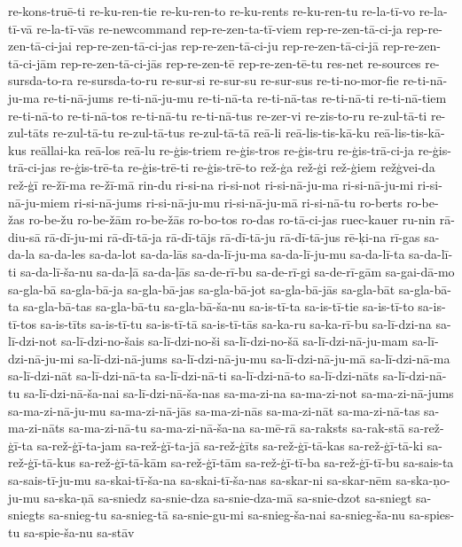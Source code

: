 {re-kons-truē-ti
re-ku-ren-tie
re-ku-ren-to
re-ku-rents
re-ku-ren-tu
re-la-tī-vo
re-la-tī-vā
re-la-tī-vās
re-newcommand
rep-re-zen-ta-tī-viem
rep-re-zen-tā-ci-ja
rep-re-zen-tā-ci-jai
rep-re-zen-tā-ci-jas
rep-re-zen-tā-ci-ju
rep-re-zen-tā-ci-jā
rep-re-zen-tā-ci-jām
rep-re-zen-tā-ci-jās
rep-re-zen-tē
rep-re-zen-tē-tu
res-net
re-sources
re-sursda-to-ra
re-sursda-to-ru
re-sur-si
re-sur-su
re-sur-sus
re-ti-no-mor-fie
re-ti-nā-ju-ma
re-ti-nā-jums
re-ti-nā-ju-mu
re-ti-nā-ta
re-ti-nā-tas
re-ti-nā-ti
re-ti-nā-tiem
re-ti-nā-to
re-ti-nā-tos
re-ti-nā-tu
re-ti-nā-tus
re-zer-vi
re-zis-to-ru
re-zul-tā-ti
re-zul-tāts
re-zul-tā-tu
re-zul-tā-tus
re-zul-tā-tā
reā-li
reā-lis-tis-kā-ku
reā-lis-tis-kā-kus
reāllai-ka
reā-los
reā-lu
re-ģis-triem
re-ģis-tros
re-ģis-tru
re-ģis-trā-ci-ja
re-ģis-trā-ci-jas
re-ģis-trē-ta
re-ģis-trē-ti
re-ģis-trē-to
rež-ģa
rež-ģi
rež-ģiem
režģvei-da
rež-ģī
re-žī-ma
re-žī-mā
rin-du
ri-si-na
ri-si-not
ri-si-nā-ju-ma
ri-si-nā-ju-mi
ri-si-nā-ju-miem
ri-si-nā-jums
ri-si-nā-ju-mu
ri-si-nā-ju-mā
ri-si-nā-tu
ro-berts
ro-be-žas
ro-be-žu
ro-be-žām
ro-be-žās
ro-bo-tos
ro-das
ro-tā-ci-jas
ruec-kauer
ru-nin
rā-diu-sā
rā-dī-ju-mi
rā-dī-tā-ja
rā-dī-tājs
rā-dī-tā-ju
rā-dī-tā-jus
rē-ķi-na
rī-gas
sa-da-la
sa-da-les
sa-da-lot
sa-da-lās
sa-da-lī-ju-ma
sa-da-lī-ju-mu
sa-da-lī-ta
sa-da-lī-ti
sa-da-lī-ša-nu
sa-da-ļā
sa-da-ļās
sa-de-rī-bu
sa-de-rī-gi
sa-de-rī-gām
sa-gai-dā-mo
sa-gla-bā
sa-gla-bā-ja
sa-gla-bā-jas
sa-gla-bā-jot
sa-gla-bā-jās
sa-gla-bāt
sa-gla-bā-ta
sa-gla-bā-tas
sa-gla-bā-tu
sa-gla-bā-ša-nu
sa-is-tī-ta
sa-is-tī-tie
sa-is-tī-to
sa-is-tī-tos
sa-is-tīts
sa-is-tī-tu
sa-is-tī-tā
sa-is-tī-tās
sa-ka-ru
sa-ka-rī-bu
sa-lī-dzi-na
sa-lī-dzi-not
sa-lī-dzi-no-šais
sa-lī-dzi-no-ši
sa-lī-dzi-no-šā
sa-lī-dzi-nā-ju-mam
sa-lī-dzi-nā-ju-mi
sa-lī-dzi-nā-jums
sa-lī-dzi-nā-ju-mu
sa-lī-dzi-nā-ju-mā
sa-lī-dzi-nā-ma
sa-lī-dzi-nāt
sa-lī-dzi-nā-ta
sa-lī-dzi-nā-ti
sa-lī-dzi-nā-to
sa-lī-dzi-nāts
sa-lī-dzi-nā-tu
sa-lī-dzi-nā-ša-nai
sa-lī-dzi-nā-ša-nas
sa-ma-zi-na
sa-ma-zi-not
sa-ma-zi-nā-jums
sa-ma-zi-nā-ju-mu
sa-ma-zi-nā-jās
sa-ma-zi-nās
sa-ma-zi-nāt
sa-ma-zi-nā-tas
sa-ma-zi-nāts
sa-ma-zi-nā-tu
sa-ma-zi-nā-ša-na
sa-mē-rā
sa-raksts
sa-rak-stā
sa-rež-ģī-ta
sa-rež-ģī-ta-jam
sa-rež-ģī-ta-jā
sa-rež-ģīts
sa-rež-ģī-tā-kas
sa-rež-ģī-tā-ki
sa-rež-ģī-tā-kus
sa-rež-ģī-tā-kām
sa-rež-ģī-tām
sa-rež-ģī-tī-ba
sa-rež-ģī-tī-bu
sa-sais-ta
sa-sais-tī-ju-mu
sa-skai-tī-ša-na
sa-skai-tī-ša-nas
sa-skar-ni
sa-skar-nēm
sa-ska-ņo-ju-mu
sa-ska-ņā
sa-sniedz
sa-snie-dza
sa-snie-dza-mā
sa-snie-dzot
sa-sniegt
sa-sniegts
sa-snieg-tu
sa-snieg-tā
sa-snie-gu-mi
sa-snieg-ša-nai
sa-snieg-ša-nu
sa-spies-tu
sa-spie-ša-nu
sa-stāv
}
